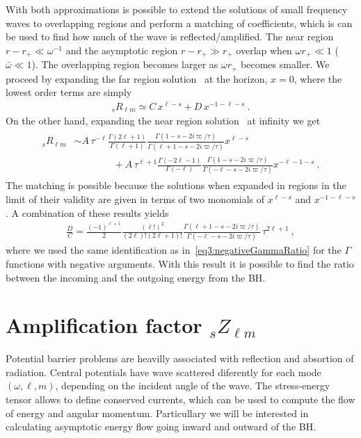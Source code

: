 With both approximations is possible to extend the solutions of small frequency waves to overlapping regions and perform a matching of coefficients, which is can be used to find how much of the wave is reflected/amplified.
The near region $r-r_{+}\ll \omega^{-1}$ and the asymptotic region $r-r_{+}\gg r_{+}$ overlap when $\omega r_{+} \ll 1$ ($\bar{\omega}\ll 1$). The overlapping region becomes larger as $\omega r_{+}$ becomes smaller.
We proceed by expanding the far region solution~ at the horizon, $x=0$, where the lowest order terms are simply
\begin{align}
    {}_{s}R_{\ell m} \simeq C \, x^{\ell-s} + D \, x^{-1-\ell-s} ~.
\end{align}
On the other hand, expanding the near region solution~ at infinity we get
\begin{align}
    \begin{split}
        {}_{s}R_{\ell m} &\sim A \, \tau^{-\ell} \frac{ \Gamma(2\ell+1)}{\Gamma(\ell+1)} \frac{\Gamma(1-s - 2 i \varpi/\tau)}{\Gamma(\ell+1 - s - 2 i \varpi/\tau)} x^{\ell-s} \\
        &\qquad\qquad + A \, \tau^{\ell+1} \frac{\Gamma(-2\ell-1)}{\Gamma(-\ell)} \frac{\Gamma(1 - s - 2 i \varpi/\tau)}{ \Gamma(-\ell - s - 2 i \varpi/\tau)} x^{-\ell-1-s} ~.
    \end{split}
\end{align}
The matching is possible because the solutions when expanded in regions in the limit of their validity are given in terms of two monomials of $x^{\ell-s}$ and $x^{-1-\ell-s}$.
A combination of these results yields
\begin{align}
    \frac{D}{C} = \frac{(-1)^{\ell+1}}{2} \frac{(\ell !)^2}{(2\ell)! (2\ell+1)!} \frac{\Gamma(\ell+1 - s - 2 i \varpi/\tau)}{\Gamma(-\ell - s - 2 i \varpi/\tau)} \, \tau^{2\ell+1} ~,
\end{align}
where we used the same identification as in~\eqref{eq3:negativeGammaRatio} for the $\Gamma$ functions with negative arguments.
With this result it is possible to find the ratio between the incoming and the outgoing energy from the BH.

\section{Amplification factor ${}_{s}Z_{\ell m}$}

Potential barrier problems are heavilly associated with reflection and absortion of radiation. 
Central potentials have wave scattered diferently for each mode $(\omega, \ell, m)$, depending on the incident angle of the wave.
The stress-energy tensor allows to define conserved currents, which can be used to compute the flow of energy and angular momentum.
Particullary we will be interested in calculating asymptotic energy flow going inward and outward of the BH.

